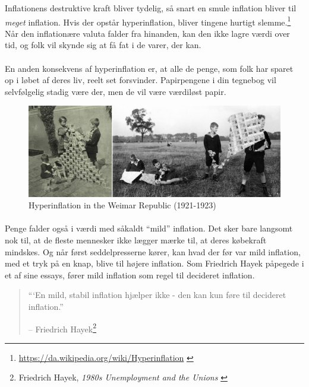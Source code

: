 \documentclass[paper=6in:9in,pagesize=pdftex,headinclude=on,footinclude=on,12pt]{scrbook}
\begin{document}
Inflationens destruktive kraft bliver tydelig, så snart en smule inflation bliver til \textit{meget} inflation. Hvis der opstår hyperinflation, bliver tingene hurtigt slemme.\footnote{\url{https://da.wikipedia.org/wiki/Hyperinflation} \cite{wiki:hyperinflation}} Når den inflationære valuta falder fra hinanden, kan den ikke lagre værdi over tid, og folk vil skynde sig at få fat i de varer, der kan.\paragraph{} En anden konsekvens af hyperinflation er, at alle de penge, som folk har sparet op i løbet af deres liv, reelt set forsvinder. Papirpengene i din tegnebog vil selvfølgelig stadig være der, men de vil være værdiløst papir.\begin{figure}
  \includegraphics{assets/images/children-playing-with-money.png}
  \caption{Hyperinflation in the Weimar Republic (1921-1923)}
  \label{fig:children-playing-with-money}
\end{figure}

\paragraph{} Penge falder også i værdi med såkaldt \enquote{mild} inflation. Det sker bare langsomt nok til, at de fleste mennesker ikke lægger mærke til, at deres købekraft mindskes. Og når først seddelpresserne kører, kan hvad der før var mild inflation, med et tryk på en knap, blive til højere inflation. Som Friedrich Hayek påpegede i et af sine essays, fører mild inflation som regel til decideret inflation.\begin{quotation}\begin{samepage} \enquote{`En mild, stabil inflation hjælper ikke - den kan kun føre til decideret inflation.} \begin{flushright} -- Friedrich Hayek\footnote{Friedrich Hayek, \textit{1980s Unemployment and the Unions} \cite{hayek-inflation}}
\end{flushright}\end{samepage}\end{quotation}
\end{document}
